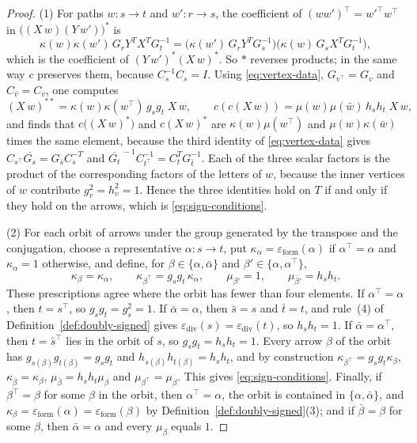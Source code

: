 \documentclass[12pt, a4paper]{report}
\theoremstyle{plain}
\theoremstyle{definition}
\theoremstyle{remark}
\theoremstyle{plain}
\newcommand{\epsilondiv}{\varepsilon_{\mathrm{div}}}
\newcommand{\epsilonform}{\varepsilon_{\mathrm{form}}}
\begin{document}
\begin{proof}
(1) For paths $w:s\to t$ and $w':r\to s$, the coefficient of $(ww')^{\top}=w'^{\top}w^{\top}$ in $\bigl((X\,w)(Y\,w')\bigr)^*$ is
\[ \kappa(w)\kappa(w')\,G_rY^TX^TG_t^{-1}=\bigl(\kappa(w')\,G_rY^TG_s^{-1}\bigr)\bigl(\kappa(w)\,G_sX^TG_t^{-1}\bigr), \]
which is the coefficient of $(Y\,w')^*(X\,w)^*$. So $*$ reverses products; in the same way $c$ preserves them, because $C_s^{-1}C_s=I$. Using \eqref{eq:vertex-data}, $G_{v^{\top}}=G_v$ and $C_{\bar v}=C_v$, one computes
\[ (X\,w)^{**}=\kappa(w)\kappa(w^{\top})\,g_sg_t\;X\,w,\qquad c(c(X\,w))=\mu(w)\mu(\bar w)\,h_sh_t\;X\,w , \]
and finds that $c\bigl((X\,w)^*\bigr)$ and $c(X\,w)^*$ are $\kappa(w)\mu(w^{\top})$ and $\mu(w)\kappa(\bar w)$ times the same element, because the third identity of \eqref{eq:vertex-data} gives $C_{s^{\top}}\overline{G_s}=G_{\bar s}C_s^{-T}$ and $\overline{G_t}^{\,-1}C_{t^{\top}}^{-1}=C_t^TG_{\bar t}^{-1}$. Each of the three scalar factors is the product of the corresponding factors of the letters of $w$, because the inner vertices of $w$ contribute $g_v^2=h_v^2=1$. Hence the three identities hold on $T$ if and only if they hold on the arrows, which is \eqref{eq:sign-conditions}.

(2) For each orbit of arrows under the group generated by the transpose and the conjugation, choose a representative $\alpha:s\to t$, put $\kappa_\alpha=\epsilonform(\alpha)$ if $\alpha^{\top}=\alpha$ and $\kappa_\alpha=1$ otherwise, and define, for $\beta\in\{\alpha,\bar\alpha\}$ and $\beta'\in\{\alpha,\alpha^{\top}\}$,
\[ \kappa_\beta=\kappa_\alpha,\qquad \kappa_{\beta^{\top}}=g_sg_t\,\kappa_\alpha,\qquad \mu_{\beta'}=1,\qquad \mu_{\bar\beta'}=h_sh_t . \]
These prescriptions agree where the orbit has fewer than four elements. If $\alpha^{\top}=\alpha$, then $t=s^{\top}$, so $g_sg_t=g_s^2=1$. If $\bar\alpha=\alpha$, then $\bar s=s$ and $\bar t=t$, and rule~(4) of Definition~\ref{def:doubly-signed} gives $\epsilondiv(s)=\epsilondiv(t)$, so $h_sh_t=1$. If $\bar\alpha=\alpha^{\top}$, then $t=\bar s^{\top}$ lies in the orbit of $s$, so $g_sg_t=h_sh_t=1$. Every arrow $\beta$ of the orbit has $g_{s(\beta)}g_{t(\beta)}=g_sg_t$ and $h_{s(\beta)}h_{t(\beta)}=h_sh_t$, and by construction $\kappa_{\beta^{\top}}=g_sg_t\kappa_\beta$, $\kappa_{\bar\beta}=\kappa_\beta$, $\mu_{\bar\beta}=h_sh_t\mu_\beta$ and $\mu_{\beta^{\top}}=\mu_\beta$. This gives \eqref{eq:sign-conditions}. Finally, if $\beta^{\top}=\beta$ for some $\beta$ in the orbit, then $\alpha^{\top}=\alpha$, the orbit is contained in $\{\alpha,\bar\alpha\}$, and $\kappa_\beta=\epsilonform(\alpha)=\epsilonform(\beta)$ by Definition~\ref{def:doubly-signed}(3); and if $\bar\beta=\beta$ for some $\beta$, then $\bar\alpha=\alpha$ and every $\mu_\beta$ equals $1$.


\end{proof}
\end{document}
